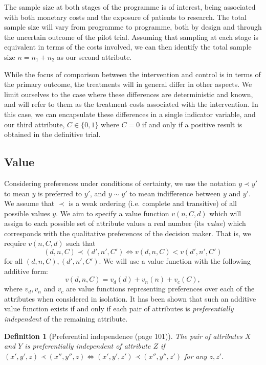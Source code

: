 \documentclass[sagev, Crown]{sagej} %
\newtheorem*{mydef}{Definition}
\begin{document}
The sample size at both stages of the programme is of interest, being associated with both monetary costs and the exposure of patients to research. The total sample size will vary from programme to programme, both by design and through the uncertain outcome of the pilot trial. Assuming that sampling at each stage is equivalent in terms of the costs involved, we can then identify the total sample size $n = n_1 + n_2$ as our second attribute. 

While the focus of comparison between the intervention and control is in terms of the primary outcome, the treatments will in general differ in other aspects. We limit ourselves to the case where these differences are deterministic and known, and will refer to them as the treatment costs associated with the intervention. In this case, we can encapsulate these differences in a single indicator variable, and our third attribute,  $C \in \{0, 1\}$ where $C = 0$ if and only if a positive result is obtained in the definitive trial. 

\subsection{Value}

Considering preferences under conditions of certainty, we use the notation $y \prec y'$ to mean $y$ is preferred to $y'$, and $y \sim y'$ to mean indifference between $y$ and $y'$. We assume that $\prec$ is a weak ordering (i.e. complete and transitive) of all possible values $y$. We aim to specify a value function $v(n, C, d)$ which will assign to each possible set of attribute values a real number (its \emph{value}) which corresponds with the qualitative preferences of the decision maker. That is, we require $v(n, C, d)$ such that
$$
(d, n, C) \prec (d', n', C') \Leftrightarrow v(d, n, C) < v(d', n', C')
$$
for all $(d, n, C), (d', n', C')$. We will use a value function with the following additive form:
$$ 
v(d, n, C) =  v_d(d) + v_n(n) + v_c(C),
$$
where $v_d, v_n$ and $v_c$ are value functions representing preferences over each of the attributes when considered in isolation. It has been shown that such an additive value function exists if and only if each pair of attributes is \emph{preferentially independent} of the remaining attribute.

\begin{mydef}[Preferential independence  \cite{Keeney1976} (page 101)] %
 The pair of attributes $X$ and $Y$ is preferentially independent of attribute $Z$ if $(x', y', z) \prec (x'', y'', z) \Longleftrightarrow  (x', y', z') \prec (x'', y'', z')$ for any $z, z'$.
\end{mydef}
\end{document}

